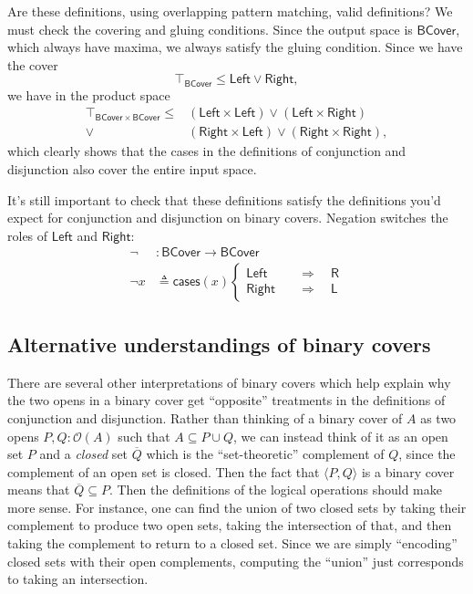 \documentclass[conference]{IEEEtran}
\newcommand{\Open}[1]{\mathcal{O}({#1})}
\newcommand{\Branch}{\Rightarrow}
\begin{document}
Are these definitions, using overlapping pattern matching, valid definitions? We must check the covering and gluing conditions. Since the output space is $\mathsf{BCover}$, which always have maxima, we always satisfy the gluing condition. Since we have the cover
\[
\top_\mathsf{BCover} \le \mathsf{Left} \vee \mathsf{Right},
\]
we have in the product space
\begin{align*}
\top_{\mathsf{BCover} \times \mathsf{BCover}} \le 
  &(\mathsf{Left} \times \mathsf{Left}) \vee (\mathsf{Left} \times \mathsf{Right})
\\ \vee &(\mathsf{Right} \times \mathsf{Left}) \vee (\mathsf{Right} \times \mathsf{Right}),
\end{align*}
which clearly shows that the cases in the definitions of conjunction and disjunction also cover the entire input space.

It's still important to check that these definitions satisfy the definitions you'd expect for conjunction and disjunction on binary covers. Negation switches the roles of $\mathsf{Left}$ and $\mathsf{Right}$:
\begin{align*}
 \neg &: \mathsf{BCover} \to \mathsf{BCover}
\\ \neg x &\triangleq \mathsf{cases}(x)
\begin{cases}
\mathsf{Left}
 \quad &\Branch \quad
 \mathsf{R}
\\
\mathsf{Right}
 \quad &\Branch \quad
 \mathsf{L}
\end{cases}
\end{align*}

\subsection{Alternative understandings of binary covers}

There are several other interpretations of binary covers which help explain why the two opens in a binary cover get ``opposite'' treatments in the definitions of conjunction and disjunction. Rather than thinking of a binary cover of $A$ as two opens $P, Q : \Open{A}$ such that $A \subseteq P \cup Q$, we can instead think of it as an open set $P$ and a \emph{closed} set $\overline{Q}$ which is the ``set-theoretic'' complement of $Q$, since the complement of an open set is closed. Then the fact that $\langle P, Q \rangle$ is a binary cover means that $\overline{Q} \subseteq P$. Then the definitions of the logical operations should make more sense. For instance, one can find the union of two closed sets by taking their complement to produce two open sets, taking the intersection of that, and then taking the complement to return to a closed set. Since we are simply ``encoding'' closed sets with their open complements, computing the ``union'' just corresponds to taking an intersection.
\end{document}
